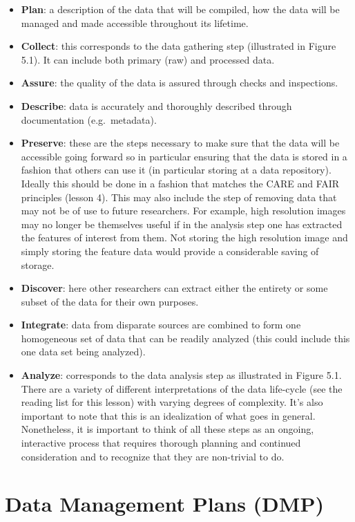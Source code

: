 \documentclass[
  letterpaper,
  DIV=11,
  numbers=noendperiod]{scrreport}
\providecommand{\tightlist}{%
  \setlength{\itemsep}{0pt}\setlength{\parskip}{0pt}}\usepackage{longtable,booktabs,array}
\begin{document}
\begin{itemize}
\tightlist
\item
  \textbf{Plan}: a description of the data that will be compiled, how
  the data will be managed and made accessible throughout its lifetime.
\item
  \textbf{Collect}: this corresponds to the data gathering step
  (illustrated in Figure 5.1). It can include both primary (raw) and
  processed data.
\item
  \textbf{Assure}: the quality of the data is assured through checks and
  inspections.
\item
  \textbf{Describe}: data is accurately and thoroughly described through
  documentation (e.g.~metadata).
\item
  \textbf{Preserve}: these are the steps necessary to make sure that the
  data will be accessible going forward so in particular ensuring that
  the data is stored in a fashion that others can use it (in particular
  storing at a data repository). Ideally this should be done in a
  fashion that matches the CARE and FAIR principles (lesson 4). This may
  also include the step of removing data that may not be of use to
  future researchers. For example, high resolution images may no longer
  be themselves useful if in the analysis step one has extracted the
  features of interest from them. Not storing the high resolution image
  and simply storing the feature data would provide a considerable
  saving of storage.
\item
  \textbf{Discover}: here other researchers can extract either the
  entirety or some subset of the data for their own purposes.
\item
  \textbf{Integrate}: data from disparate sources are combined to form
  one homogeneous set of data that can be readily analyzed (this could
  include this one data set being analyzed).
\item
  \textbf{Analyze}: corresponds to the data analysis step as illustrated
  in Figure 5.1. There are a variety of different interpretations of the
  data life-cycle (see the reading list for this lesson) with varying
  degrees of complexity. It's also important to note that this is an
  idealization of what goes in general. Nonetheless, it is important to
  think of all these steps as an ongoing, interactive process that
  requires thorough planning and continued consideration and to
  recognize that they are non-trivial to do.
\end{itemize}

\hypertarget{data-management-plans-dmp}{%
\section{Data Management Plans (DMP)}\label{data-management-plans-dmp}}
\end{document}
